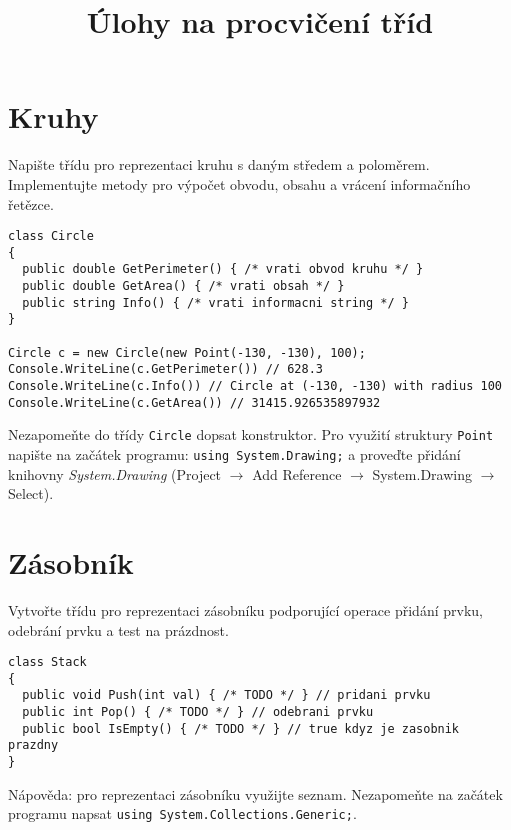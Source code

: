 \documentclass[12pt,a4paper]{article}
\begin{document}
\pagestyle{empty}
\title{Úlohy na procvičení tříd}
\date{\vspace{-12ex}}
\setlength{\droptitle}{-6em}
\setlength{\parindent}{0cm}
\maketitle

\section{Kruhy}

Napište třídu pro reprezentaci kruhu s daným středem a poloměrem. Implementujte
metody pro výpočet obvodu, obsahu a vrácení informačního řetězce.

\begin{verbatim}
class Circle
{
  public double GetPerimeter() { /* vrati obvod kruhu */ }
  public double GetArea() { /* vrati obsah */ }
  public string Info() { /* vrati informacni string */ }
}

Circle c = new Circle(new Point(-130, -130), 100);
Console.WriteLine(c.GetPerimeter()) // 628.3
Console.WriteLine(c.Info()) // Circle at (-130, -130) with radius 100
Console.WriteLine(c.GetArea()) // 31415.926535897932
\end{verbatim}

Nezapomeňte do třídy \texttt{Circle} dopsat konstruktor. Pro využití struktury
\texttt{Point} napište na začátek programu: \texttt{using System.Drawing;}
a proveďte přidání knihovny \textit{System.Drawing} (Project $\rightarrow$
Add Reference $\rightarrow$ System.Drawing $\rightarrow$ Select).

\section{Zásobník}

Vytvořte třídu pro reprezentaci zásobníku podporující operace přidání prvku,
odebrání prvku a test na prázdnost.

\begin{verbatim}
class Stack
{
  public void Push(int val) { /* TODO */ } // pridani prvku
  public int Pop() { /* TODO */ } // odebrani prvku
  public bool IsEmpty() { /* TODO */ } // true kdyz je zasobnik prazdny
}
\end{verbatim}

Nápověda: pro reprezentaci zásobníku využijte seznam. Nezapomeňte na začátek
programu napsat \texttt{using System.Collections.Generic;}.
\end{document}

